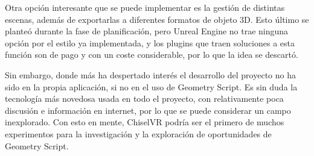 Otra opción interesante que se puede implementar es la gestión de distintas escenas, además de exportarlas a diferentes formatos de objeto 3D. Esto último se planteó durante la fase de planificación, pero Unreal Engine no trae ninguna opción por el estilo ya implementada, y los plugins que traen soluciones a esta función son de pago y con un coste considerable, por lo que la idea se descartó.

Sin embargo, donde más ha despertado interés el desarrollo del proyecto no ha sido en la propia aplicación, si no en el uso de Geometry Script. Es sin duda la tecnología más novedosa usada en todo el proyecto, con relativamente poca discusión e información en internet, por lo que se puede considerar un campo inexplorado. Con esto en mente, ChiselVR podría ser el primero de muchos experimentos para la investigación y la exploración de oportunidades de Geometry Script.